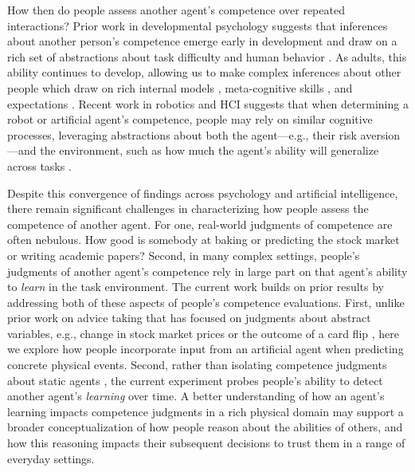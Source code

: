\documentclass[10pt,letterpaper]{article}
\begin{document}
How then do people assess another agent's competence over repeated interactions? Prior work in developmental psychology suggests that inferences about another person's competence emerge early in development and draw on a rich set of abstractions about task difficulty and human behavior \cite{gweon2021inferential, leonard2019better}. As adults, this ability continues to develop, allowing us to make complex inferences about other people which draw on rich internal models \cite{velez2019integrating, velez2021learning}, meta-cognitive skills \cite{pescetelli2021role}, and expectations \cite{leong2018unrealistic, chang2010seeing}. Recent work in robotics and HCI suggests that when determining a robot or artificial agent's competence, people may rely on similar cognitive processes, leveraging abstractions about both the agent---e.g., their risk aversion \cite{xie2019robot}---and the environment, such as how much the agent's ability will generalize across tasks \cite{soh2020multi}. 

Despite this convergence of findings across psychology and artificial intelligence, there remain significant challenges in characterizing how people assess the competence of another agent. For one, real-world judgments of competence are often nebulous. How good is somebody at baking or predicting the stock market or writing academic papers? Second, in many complex settings, people's judgments of another agent's competence rely in large part on that agent's ability to \textit{learn} in the task environment. The current work builds on prior results by addressing both of these aspects of people's competence evaluations. First, unlike prior work on advice taking that has focused on judgments about abstract variables, e.g., change in stock market prices \cite{leong2018unrealistic} or the outcome of a card flip \cite{velez2019integrating}, here we explore how people incorporate input from an artificial agent when predicting concrete physical events. Second, rather than isolating competence judgments about static agents \cite{chen2020trust}, the current experiment probes people's ability to detect another agent's \textit{learning} over time. A better understanding of how an agent's learning impacts competence judgments in a rich physical domain may support a broader conceptualization of how people reason about the abilities of others, and how this reasoning impacts their subsequent decisions to trust them in a range of everyday settings.
\end{document}
